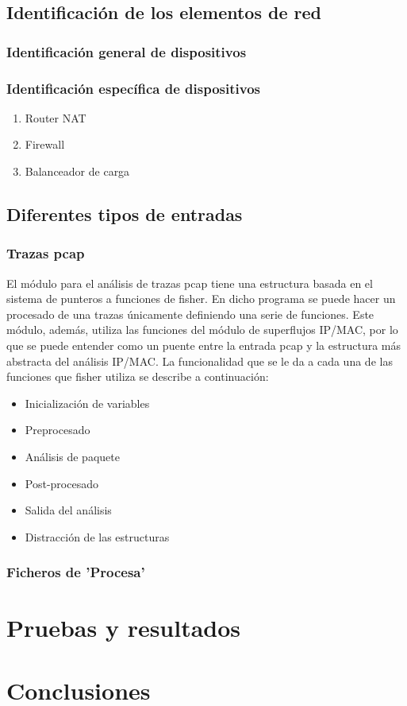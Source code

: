 \documentclass[twoside, 12pt]{epstfg}
\begin{document}
\section{Identificación de los elementos de red}
\subsection{Identificación general de dispositivos}
\subsection{Identificación específica de dispositivos}
\begin{enumerate}[itemsep=0pt, topsep = 0pt]
\item Router NAT
\item Firewall
\item Balanceador de carga
\end{enumerate}

\section{Diferentes tipos de entradas}
\subsection{Trazas pcap}
El módulo para el análisis de trazas pcap tiene una estructura basada en el sistema de punteros a funciones de fisher. En dicho programa se puede hacer un procesado de una trazas únicamente definiendo una serie de funciones. Este módulo, además, utiliza las funciones del módulo de superflujos IP/MAC, por lo que se puede entender como un puente entre la entrada pcap y la estructura más abstracta del análisis IP/MAC. La funcionalidad que se le da a cada una de las funciones que fisher utiliza se describe a continuación:
\begin{itemize}
	\item{Inicialización de variables}
	\item{Preprocesado}
	\item{Análisis de paquete}
	\item{Post-procesado}
	\item{Salida del análisis}
	\item{Distracción de las estructuras}
\end{itemize}

\subsection{Ficheros de 'Procesa'}

\chapter{Pruebas y resultados}

\chapter{Conclusiones}
\label{chap:Conclusiones}

\backmatter
\appendix

\cleardoublepage

\nocite{*}
{}

\cleardoublepage
\printindex
\end{document}
